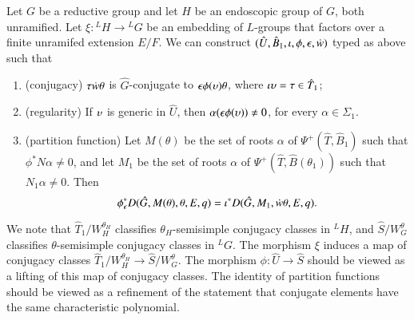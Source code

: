 \begin{proposition}\label{lemma:ephi}
  Let $G$ be a reductive group and let $H$ be an endoscopic group of
  $G$, both unramified.  Let $\xi:{}^LH\to {}^LG$ be an embedding of
  $L$-groups that factors over a finite unramifed extension $E/F$.
  We can construct $(\hat U,\hat B_1,\iota,\phi,\epsilon,\dot w)$ typed as above
  such that
\begin{enumerate}
\item (conjugacy) $\tau\dot w\theta$ is $\hat G$-conjugate to
  $\epsilon\phi(\upsilon) \theta$, where $\iota\upsilon = \tau\in\hat T_1$;
\item (regularity) If $\upsilon$ is generic in $\hat U$, then
  $\alpha(\epsilon\phi(\upsilon))\ne 0$, for every $\alpha\in\Sigma_1$.
\item (partition function) Let $M(\theta)$ be the set of roots $\alpha$ of
  $\Psi^+(\hat T,\hat B_1)$ such that $\phi^*N\alpha\ne 0$, and let
  $M_1$ be the set of roots $\alpha$ of $\Psi^+(\hat T,\hat B(\theta_1))$ such
  that $N_1\alpha\ne0$.  Then
\begin{equation}
\phi^*_\epsilon D(\hat G,M(\theta),\theta,E,q) =\iota^* D(\hat G,M_1,\dot w\theta,E,q).
\end{equation}
\end{enumerate}
\end{proposition}

We note that $\hat T_1/W_H^{\theta_H}$ classifies
$\theta_H$-semisimple conjugacy classes in ${}^LH$, and
$\hat S/W_G^{\theta}$ classifies $\theta$-semisimple conjugacy classes
in ${}^LG$.  The morphism $\xi$ induces a map of conjugacy classes
$\hat T_1/W_H^{\theta_H}\to \hat S/W_G^\theta$.  The morphism
$\phi:\hat U\to\hat S$ should be viewed as a lifting of this map of
conjugacy classes.  The identity of partition functions should be
viewed as a refinement of the statement that conjugate elements have
the same characteristic polynomial.


